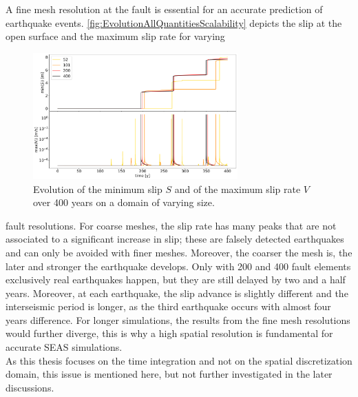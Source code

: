 A fine mesh resolution at the fault is essential for an accurate prediction of earthquake events. \autoref{fig:EvolutionAllQuantitiesScalability} depicts the slip at the open surface and the maximum slip rate for varying

\begin{figure}[H]
	\centering
	\includegraphics[width=0.7\textwidth]{images/TANDEMtimeEvolution_2D_scalability_extendedODE_RK.png}
	\caption{Evolution of the minimum slip $S$ and of the maximum slip rate $V$ over 400 years on a domain of varying size.}
	\label{fig:EvolutionAllQuantitiesScalability}
\end{figure}

 \noindent fault resolutions. For coarse meshes, the slip rate has many peaks that are not associated to a significant increase in slip; these are falsely detected earthquakes and can only be avoided with finer meshes. Moreover, the coarser the mesh is, the later and stronger the earthquake develops. Only with 200 and 400 fault elements exclusively real earthquakes happen, but they are still delayed by two and a half years. Moreover, at each earthquake, the slip advance is slightly different and the interseismic period is longer, as the third earthquake occurs with almost four years difference. For longer simulations, the results from the fine mesh resolutions would further diverge, this is why a high spatial resolution is fundamental for accurate SEAS simulations. \\


As this thesis focuses on the time integration and not on the spatial discretization domain, this issue is mentioned here, but not further investigated in the later discussions.
